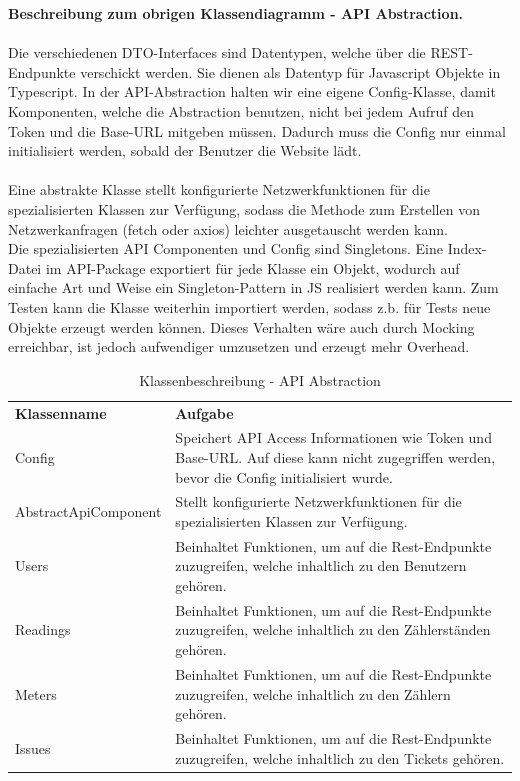\textbf{Beschreibung zum obrigen Klassendiagramm - API Abstraction.} \\ \\
Die verschiedenen DTO-Interfaces sind Datentypen, welche über die REST-Endpunkte verschickt werden. Sie dienen als Datentyp für Javascript Objekte in Typescript. In der API-Abstraction halten wir eine eigene Config-Klasse, damit Komponenten, welche die Abstraction benutzen, nicht bei jedem Aufruf den Token und die Base-URL mitgeben müssen. Dadurch muss die Config nur einmal initialisiert werden, sobald der Benutzer die Website lädt. \\\\
Eine abstrakte Klasse stellt konfigurierte Netzwerkfunktionen für die spezialisierten Klassen zur Verfügung, sodass die Methode zum Erstellen von Netzwerkanfragen (fetch oder axios) leichter ausgetauscht werden kann. \\
Die spezialisierten API Componenten und Config sind Singletons. Eine Index-Datei im API-Package exportiert für jede Klasse ein Objekt, wodurch auf einfache Art und Weise ein Singleton-Pattern in JS realisiert werden kann.
Zum Testen kann die Klasse weiterhin importiert werden, sodass z.b. für Tests neue Objekte erzeugt werden können. Dieses Verhalten wäre auch durch Mocking erreichbar, ist jedoch aufwendiger umzusetzen und erzeugt mehr Overhead. \\

\begin{table}[H]
	\centering
	\begin{tabularx}{\textwidth}{X X}
		\rowcolor[HTML]{C0C0C0} 
		\textbf{Klassenname} & \textbf{Aufgabe} \\
		Config& Speichert API Access Informationen wie Token und Base-URL. Auf diese kann nicht zugegriffen werden, bevor die Config initialisiert wurde.  \\
		\rowcolor[HTML]{E7E7E7} 
		AbstractApiComponent & Stellt konfigurierte Netzwerkfunktionen für die spezialisierten Klassen zur Verfügung. \\
		Users & Beinhaltet Funktionen, um auf die Rest-Endpunkte zuzugreifen, welche inhaltlich zu den Benutzern gehören. \\
		\rowcolor[HTML]{E7E7E7} 
		Readings & Beinhaltet Funktionen, um auf die Rest-Endpunkte zuzugreifen, welche inhaltlich zu den Zählerständen gehören. \\
		Meters & Beinhaltet Funktionen, um auf die Rest-Endpunkte zuzugreifen, welche inhaltlich zu den Zählern gehören. \\
		\rowcolor[HTML]{E7E7E7} 
		Issues & Beinhaltet Funktionen, um auf die Rest-Endpunkte zuzugreifen, welche inhaltlich zu den Tickets gehören. \\
	\end{tabularx}
	\caption{Klassenbeschreibung - API Abstraction}
	\label{table:klassenbeschreibung-api Abstraction}
\end{table}



